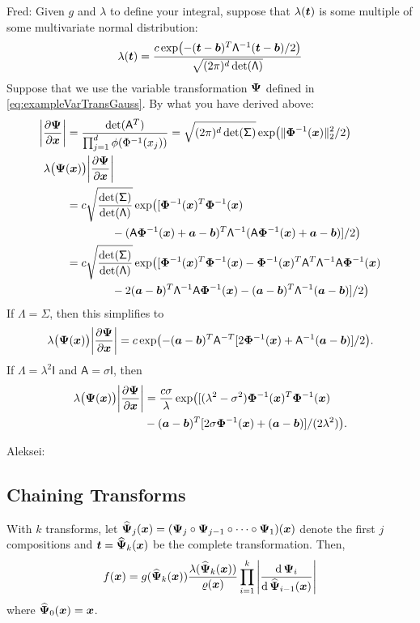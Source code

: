 \documentclass[graybox,footinfo]{svmult}
\newcommand{\QMCPYnormnorm}[2][{}]{\ensuremath{\lVert #2 \rVert}_{#1}}
\newcommand{\QMCPYabs}[1]{\ensuremath{{\left \lvert #1 \right \rvert}}}
\newcommand{\AGSComment}[1]{{\color{cyan} Aleksei: #1}}
\newcommand{\FJHComment}[1]{{\color{magenta} Fred: #1}}
\newcommand{\mA}{\mathsf{A}}
\newcommand{\mSigma}{\mathsf{\Sigma}}
\newcommand{\mLambda}{\mathsf{\Lambda}}
\newcommand{\mI}{\mathsf{I}}
\begin{document}
\FJHComment{Given $g$ and $\lambda$ to define your integral, suppose that $\lambda({\boldsymbol{t}})$ is some multiple of some multivariate normal distribution:
	\begin{equation*}
		\lambda(\bst)  = \frac{c \exp\bigl(-(\bst -\bsb)^T \mLambda^{-1}(\bst -\bsb)/2\bigr)}{\sqrt{ (2\pi)^d \det(\mLambda)}} 
	\end{equation*}
Suppose that we use the variable transformation ${\boldsymbol{\Psi}}$ defined in \eqref{eq:exampleVarTransGauss}.  By what you have derived above:
\begin{align*}
	\QMCPYabs{\frac{\partial \bsPsi}{\partial \bsx}} 
	& = \frac{\det(\mA^T)}{\prod_{j=1}^d \phi(\Phi^{-1}(x_j))} = \sqrt{(2\pi)^d \det(\mSigma)} \exp\bigl( \QMCPYnormnorm[2]{\bsPhi^{-1}(\bsx)}^2/2\bigr) \\
	\MoveEqLeft[2]{\lambda\bigl(\bsPsi(\bsx)\bigr) \QMCPYabs{\frac{\partial \bsPsi}{\partial \bsx}}} \\
	& =  c \sqrt{\frac{\det(\mSigma)}{\det(\mLambda)}} \exp \bigl( [ \bsPhi^{-1}(\bsx)^T \bsPhi^{-1}(\bsx) \\
	& \qquad \qquad -   (\mA\bsPhi^{-1}(\bsx) +\bsa -\bsb)^T\mLambda^{-1}(\mA\bsPhi^{-1}(\bsx) +\bsa -\bsb)        ] /2   \bigr) \\
	& =  c \sqrt{\frac{\det(\mSigma)}{\det(\mLambda)}} \exp \bigl( [ \bsPhi^{-1}(\bsx)^T \bsPhi^{-1}(\bsx) 
	-   \bsPhi^{-1}(\bsx)^T\mA^T\mLambda^{-1}\mA \bsPhi^{-1}(\bsx)\\
	& \qquad \qquad  - 2(\bsa -\bsb)^T \mLambda^{-1}\mA\bsPhi^{-1}(\bsx) - (\bsa -\bsb)^T \mLambda^{-1} (\bsa -\bsb)] /2   \bigr) 
\end{align*}
If $\mLambda = \mSigma$, then this simplifies to
\begin{equation*}
		\lambda\bigl(\bsPsi(\bsx)\bigr) \QMCPYabs{\frac{\partial \bsPsi}{\partial \bsx}}
	 =  c \exp \bigl( - (\bsa -\bsb)^T \mA^{-T} [
	2 \bsPhi^{-1}(\bsx) + \mA^{-1}(\bsa -\bsb)] /2   \bigr) .
\end{equation*}
If $\mLambda = \lambda^2 \mI$ and  $\mA = \sigma \mI$, then 
\begin{align*}
	\lambda\bigl(\bsPsi(\bsx)\bigr) \QMCPYabs{\frac{\partial \bsPsi}{\partial \bsx}}
	& = \frac{c\sigma}{\lambda} 
	\exp \bigl( [ (\lambda^2 -\sigma^2)\bsPhi^{-1}(\bsx)^T\bsPhi^{-1}(\bsx) 
	\\
	& -  (\bsa -\bsb)^T [
	2\sigma \bsPhi^{-1}(\bsx) + (\bsa -\bsb)] /(2\lambda^2)   \bigr) .
\end{align*}
}

\AGSComment{

\subsection{Chaining Transforms}
With $k$ transforms, let $\widehat{{\boldsymbol{\Psi}}}_j({\boldsymbol{x}}) = ({\boldsymbol{\Psi}}_j \circ {\boldsymbol{\Psi}}_{j-1} \circ \dots \circ {\boldsymbol{\Psi}}_1)({\boldsymbol{x}})$ denote the first $j$ compositions and ${\boldsymbol{t}} = \widehat{{\boldsymbol{\Psi}}}_k({\boldsymbol{x}})$ be the complete transformation. Then, 
$$f({\boldsymbol{x}}) = g(\widehat{{\boldsymbol{\Psi}}}_k({\boldsymbol{x}})) \frac{\lambda(\widehat{{\boldsymbol{\Psi}}}_k({\boldsymbol{x}}))}{\varrho({\boldsymbol{x}})} \prod_{i=1}^{k} \left\lvert \frac{\mathrm{d} \, {\boldsymbol{\Psi}}_i}{\mathrm{d} \, \widehat{{\boldsymbol{\Psi}}}_{i-1}({\boldsymbol{x}})} \right\rvert$$
where $\widehat{{\boldsymbol{\Psi}}}_0({\boldsymbol{x}}) = {\boldsymbol{x}}$.
}
\end{document}
